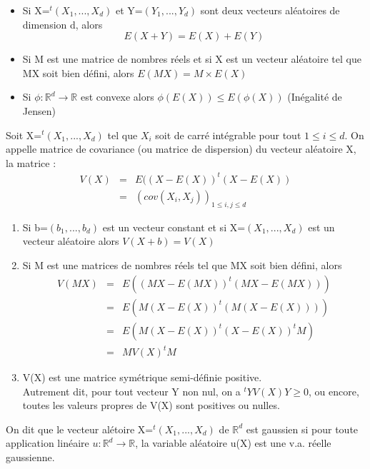 \begin{Prop}
\begin{itemize}
\item Si X=$^t(X_1,...,X_d)$ et Y=$(Y_1,...,Y_d)$ sont deux vecteurs aléatoires de dimension d, alors \[E(X+Y)=E(X)+E(Y)\]
\item Si M est une matrice de nombres réels et si X est un vecteur aléatoire tel que MX soit bien défini, alors $E(MX)=M\times E(X)$
\item Si $\phi:\mathbb{R}^d \rightarrow \mathbb{R}$ est convexe alors $\phi(E(X))\leq E(\phi(X))$ (Inégalité de Jensen)
\end{itemize}
\end{Prop}

\begin{Def}
Soit X=$^t(X_1,...,X_d)$ tel que $X_i$ soit de carré intégrable pour tout $1\leq i\leq d$. On appelle matrice de covariance (ou matrice de dispersion) du vecteur aléatoire X, la matrice : 
\begin{eqnarray*}
V(X)&=&E((X-E(X)) ^t(X-E(X)) \\
&=& \left(cov(X_i,X_j) \right)_{1\leq i,j\leq d}
\end{eqnarray*}
\end{Def}

\begin{Prop}
\begin{enumerate}
\item Si b=$(b_1,...,b_d)$ est un vecteur constant et si X=$(X_1,...,X_d)$ est un vecteur aléatoire alors $V(X+b)=V(X)$
\item Si M est une matrices de nombres réels tel que MX soit bien défini, alors 
\begin{eqnarray*}
V(MX)&=& E((MX-E(MX)) ^t(MX-E(MX))) \\
&=&E(M(X-E(X)) ^t(M(X-E(X)))) \\
&=&E(M(X-E(X)) ^t(X-E(X)) ^tM) \\
&=& M V(X) ^tM 
\end{eqnarray*}
\item V(X) est une matrice symétrique semi-définie positive. \\
Autrement dit, pour tout vecteur Y non nul, on a $^tYV(X)Y \geq 0$, ou encore, toutes les valeurs propres de V(X) sont positives ou nulles.
\end{enumerate}
\end{Prop}

\begin{Def}
On dit que le vecteur alétoire X=$^t(X_1,...,X_d)$ de $\mathbb{R}^d$ est gaussien si pour toute application linéaire $u:\mathbb{R}^d \rightarrow \mathbb{R}$, la variable aléatoire u(X) est une v.a. réelle gaussienne.
\end{Def}

